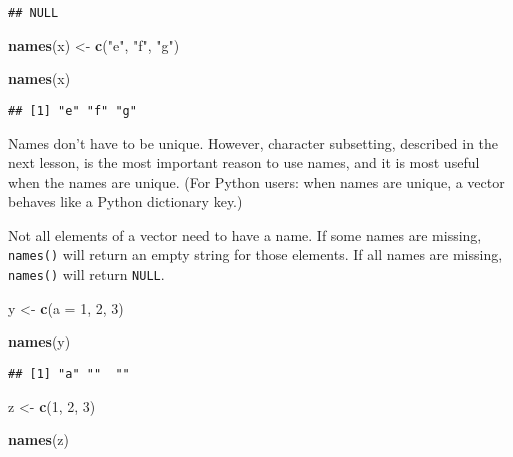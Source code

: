 \documentclass[
]{book}
\newenvironment{Shaded}{\begin{snugshade}}{\end{snugshade}}
\newcommand{\DataTypeTok}[1]{\textcolor[rgb]{0.13,0.29,0.53}{#1}}
\newcommand{\DecValTok}[1]{\textcolor[rgb]{0.00,0.00,0.81}{#1}}
\newcommand{\KeywordTok}[1]{\textcolor[rgb]{0.13,0.29,0.53}{\textbf{#1}}}
\newcommand{\NormalTok}[1]{#1}
\newcommand{\StringTok}[1]{\textcolor[rgb]{0.31,0.60,0.02}{#1}}
\begin{document}
\begin{verbatim}
## NULL
\end{verbatim}

\begin{Shaded}
\begin{Highlighting}[]
\KeywordTok{names}\NormalTok{(x) \textless{}{-}}\StringTok{ }\KeywordTok{c}\NormalTok{(}\StringTok{"e"}\NormalTok{, }\StringTok{"f"}\NormalTok{, }\StringTok{"g"}\NormalTok{)}

\KeywordTok{names}\NormalTok{(x)}
\end{Highlighting}
\end{Shaded}

\begin{verbatim}
## [1] "e" "f" "g"
\end{verbatim}

Names don't have to be unique. However, character subsetting, described in the next lesson, is the most important reason to use names, and it is most useful when the names are unique. (For Python users: when names are unique, a vector behaves like a Python dictionary key.)

Not all elements of a vector need to have a name. If some names are missing, \texttt{names()} will return an empty string for those elements. If all names are missing, \texttt{names()} will return \texttt{NULL}.

\begin{Shaded}
\begin{Highlighting}[]
\NormalTok{y \textless{}{-}}\StringTok{ }\KeywordTok{c}\NormalTok{(}\DataTypeTok{a =} \DecValTok{1}\NormalTok{, }\DecValTok{2}\NormalTok{, }\DecValTok{3}\NormalTok{)}

\KeywordTok{names}\NormalTok{(y)}
\end{Highlighting}
\end{Shaded}

\begin{verbatim}
## [1] "a" ""  ""
\end{verbatim}

\begin{Shaded}
\begin{Highlighting}[]
\NormalTok{z \textless{}{-}}\StringTok{ }\KeywordTok{c}\NormalTok{(}\DecValTok{1}\NormalTok{, }\DecValTok{2}\NormalTok{, }\DecValTok{3}\NormalTok{)}

\KeywordTok{names}\NormalTok{(z)}
\end{Highlighting}
\end{Shaded}
\end{document}
